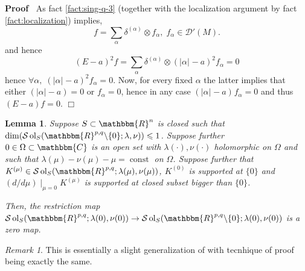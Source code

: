 \documentclass[12pt]{article}
\newcommand{\tmop}[1]{\ensuremath{\operatorname{#1}}}
\renewenvironment{proof}{\noindent\textbf{Proof\ }}{\hspace*{\fill}$\Box$\medskip}
\newtheorem{lemma}[proposition]{Lemma}
\theoremstyle{remark}
\newtheorem{remark}[proposition]{Remark}
\begin{document}
\begin{proof}
  As fact \ref{fact:sing-q-3} (together with the localization argument by fact
  \ref{fact:localization}) implies,
  \[ f = \sum_{\alpha} \delta^{(\alpha)} \otimes f_{\alpha}, \; f_{\alpha} \in
     \mathcal{D}' (M) . \]
  and hence
  \[ (E - a)^2 f = \sum_{\alpha} \delta^{(\alpha)} \otimes (| \alpha |^{} -
     a)^2 f_{\alpha} = 0 \]
  hence $\forall \alpha, \; (| \alpha |^{} - a)^2 f_{\alpha} = 0$. Now, for
  every fixed $\alpha$ the latter implies that either $(| \alpha | - a) = 0$
  or $f_{\alpha} = 0$, hence in any case $(| \alpha |^{} - a)^{} f_{\alpha} =
  0$ and thus $(E - a) f = 0$.
\end{proof}

\begin{lemma}
  \label{sol-MO:lem-zeromap-point}Suppose $S \subset \mathbbm{R}^n$ is closed
  such that $\dim (\mathcal{S} \tmop{ol}_S (\mathbbm{R}^{p, q} \backslash \{ 0
  \} ; \lambda, \nu)) \leqslant 1$. Suppose further $0 \in \Omega \subset
  \mathbbm{C}$ is an open set with $\lambda (\cdot), \nu (\cdot)$ holomorphic
  on $\Omega$ and such that $\lambda (\mu) - \nu (\mu) - \mu = \tmop{const}$
  on $\Omega$. Suppose further that $K^{(\mu)} \in \mathcal{S} \tmop{ol}_S
  (\mathbbm{R}^{p, q} ; \lambda (\mu), \nu (\mu))$, $K^{(0)}$ is supported
  at $\{ 0 \}$ and $(d / d \mu) \mid_{\mu = 0} K^{(\mu)}$ is supported
  at closed subset bigger than $\{ 0 \}$.
  
  Then, the restriction map $\mathcal{S} \tmop{ol}_S (\mathbbm{R}^{p, q} ;
  \lambda (0), \nu (0)) \rightarrow \mathcal{S} \tmop{ol}_S (\mathbbm{R}^{p,
  q} \backslash \{ 0 \} ; \lambda (0), \nu (0))$ is a zero map.
\end{lemma}

\begin{remark}
  This is essentially a slight generalization of {\cite[lemma
  11.8]{kobayashi2015symmetry}} with tecnhique of proof being exactly the
  same.
\end{remark}
\end{document}
